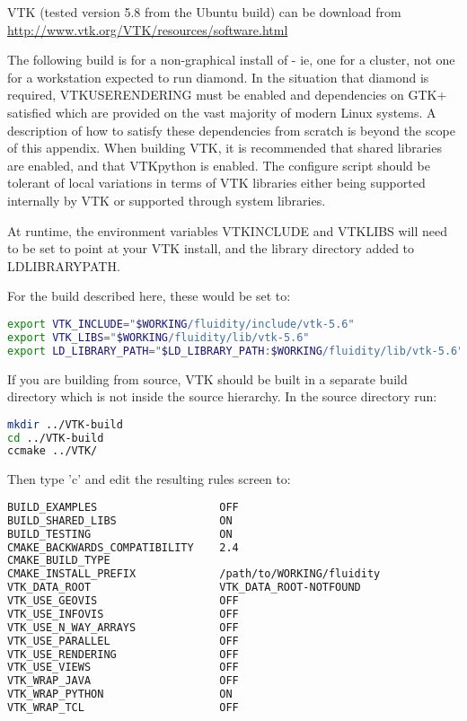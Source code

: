 VTK (tested version 5.8 from the Ubuntu build) can be download from
\url{http://www.vtk.org/VTK/resources/software.html}

The following build is for a non-graphical install of \fluidity - ie, one for a
cluster, not one for a workstation expected to run diamond. In the situation
that diamond is required, VTK{\textunderscore}USE{\textunderscore}RENDERING
must be enabled and dependencies on GTK+ satisfied which are provided on the
vast majority of modern Linux systems. A description of how to satisfy these
dependencies from scratch is beyond the scope of this appendix. When building
VTK, it is recommended that shared libraries are enabled, and that VTKpython is
enabled. The \fluidity configure script should be tolerant of local variations
in terms of VTK libraries either being supported internally by VTK or supported
through system libraries.

At runtime, the environment variables VTK{\textunderscore}INCLUDE and
VTK{\textunderscore}LIBS will need to be set to point at your VTK install, and
the library directory added to LD{\textunderscore}LIBRARY{\textunderscore}PATH.

For the build described here, these would be set to:

\begin{lstlisting}[language=bash]
export VTK_INCLUDE="$WORKING/fluidity/include/vtk-5.6"
export VTK_LIBS="$WORKING/fluidity/lib/vtk-5.6"
export LD_LIBRARY_PATH="$LD_LIBRARY_PATH:$WORKING/fluidity/lib/vtk-5.6"
\end{lstlisting}

If you are building from source, VTK should be built in a separate build
directory which is not inside the source hierarchy. In the source directory
run:

\begin{lstlisting}[language=bash]
mkdir ../VTK-build
cd ../VTK-build
ccmake ../VTK/
\end{lstlisting}

Then type 'c' and edit the resulting rules screen to:

\begin{lstlisting}[language=bash]
BUILD_EXAMPLES                   OFF
BUILD_SHARED_LIBS                ON                                     
BUILD_TESTING                    ON
CMAKE_BACKWARDS_COMPATIBILITY    2.4
CMAKE_BUILD_TYPE
CMAKE_INSTALL_PREFIX             /path/to/WORKING/fluidity          
VTK_DATA_ROOT                    VTK_DATA_ROOT-NOTFOUND
VTK_USE_GEOVIS                   OFF                                    
VTK_USE_INFOVIS                  OFF                                    
VTK_USE_N_WAY_ARRAYS             OFF
VTK_USE_PARALLEL                 OFF
VTK_USE_RENDERING                OFF                                    
VTK_USE_VIEWS                    OFF                                    
VTK_WRAP_JAVA                    OFF
VTK_WRAP_PYTHON                  ON                                     
VTK_WRAP_TCL                     OFF
\end{lstlisting}

